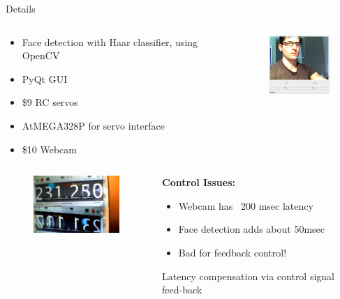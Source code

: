 \documentclass{beamer}
\begin{document}
\begin{frame}{Details}

\begin{columns}
  \begin{column}{0.7\textwidth}
\begin{itemize}
  \item Face detection with Haar classifier, using OpenCV
  \item PyQt GUI
\item \$9 RC servos
\item AtMEGA328P for servo interface
\item \$10 Webcam
\end{itemize}
\end{column}
\begin{column}{.3\textwidth}
\begin{figure}
\includegraphics[width=1in]{facetrack2d}
\end{figure}

\end{column}
\end{columns}
\begin{columns}
  \begin{column}{2in}
\begin{figure}
\includegraphics[width=1.5in]{latency}
\end{figure}
  \end{column}
\begin{column}{.6\textwidth}
\textbf{Control Issues:}
\begin{itemize}
\item Webcam has ~200 msec latency
\item Face detection adds about 50msec
\item Bad for feedback control!
\end{itemize}
Latency compensation via control signal feed-back
\end{column}
\end{columns}
\end{frame}
\end{document}
